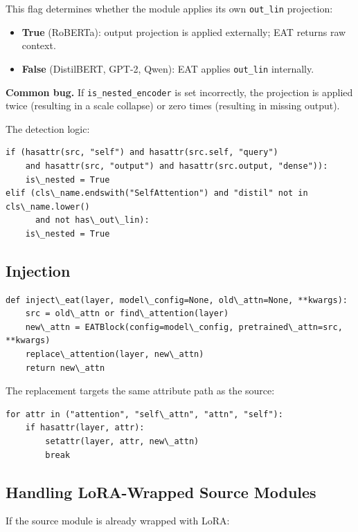This flag determines whether the module applies its own \texttt{out\_lin} projection:

\begin{itemize}
\item \textbf{True} (RoBERTa): output projection is applied externally; EAT returns
  raw context.
\item \textbf{False} (DistilBERT, GPT-2, Qwen): EAT applies \texttt{out\_lin} internally.

\end{itemize}
\textbf{Common bug.} If \texttt{is\_nested\_encoder} is set incorrectly, the projection 
is applied twice (resulting in a scale collapse) or zero times (resulting 
in missing output).

The detection logic:

\begin{lstlisting}
if (hasattr(src, "self") and hasattr(src.self, "query")
    and hasattr(src, "output") and hasattr(src.output, "dense")):
    is\_nested = True
elif (cls\_name.endswith("SelfAttention") and "distil" not in cls\_name.lower()
      and not has\_out\_lin):
    is\_nested = True
\end{lstlisting}

\subsection{Injection}

\begin{lstlisting}
def inject\_eat(layer, model\_config=None, old\_attn=None, **kwargs):
    src = old\_attn or find\_attention(layer)
    new\_attn = EATBlock(config=model\_config, pretrained\_attn=src, **kwargs)
    replace\_attention(layer, new\_attn)
    return new\_attn
\end{lstlisting}

The replacement targets the same attribute path as the source:

\begin{lstlisting}
for attr in ("attention", "self\_attn", "attn", "self"):
    if hasattr(layer, attr):
        setattr(layer, attr, new\_attn)
        break
\end{lstlisting}

\subsection{Handling LoRA-Wrapped Source Modules}

If the source module is already wrapped with LoRA:

